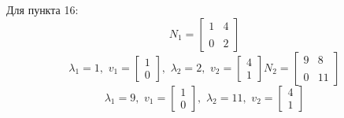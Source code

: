 \documentclass[a5paper, 10pt]{article}
\theoremstyle{definition}
\theoremstyle{plain}
\theoremstyle{remark}
\begin{document}
Для пункта 16:
\begin{equation}
N_1 =
\begin{bmatrix}
1 & 4\\
\\
0 & 2
\end{bmatrix}
\end{equation}
\begin{equation}
\lambda_1 = 1, \, \,
v_1 =
\begin{bmatrix}
1\\
0
\end{bmatrix}
, \, \,
\lambda_2 =  2, \, \,
v_2 =
\begin{bmatrix}
4\\
1
\end{bmatrix}
N_2 =
\begin{bmatrix}
9 & 8\\
\\
0 & 11
\end{bmatrix}
\end{equation}
\begin{equation}
\lambda_1 = 9, \, \,
v_1 =
\begin{bmatrix}
1\\
0
\end{bmatrix}
, \, \,
\lambda_2 =  11, \, \,
v_2 =
\begin{bmatrix}
4\\
1
\end{bmatrix}
\end{equation}
\end{document}
